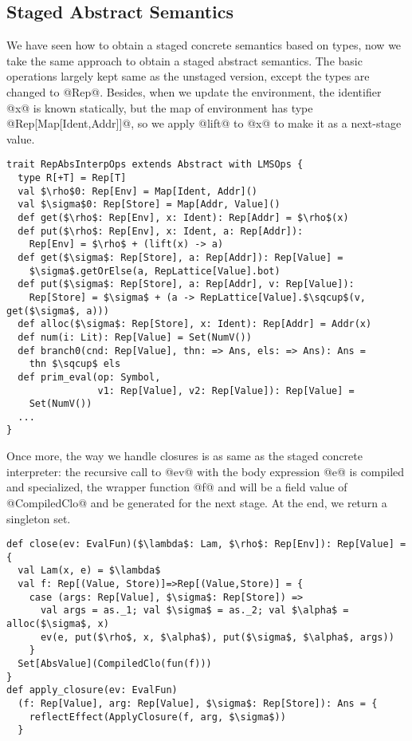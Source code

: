 \subsection{Staged Abstract Semantics} 
We have seen how to obtain a staged concrete semantics
based on types, now we take the same approach to obtain a staged abstract semantics.
The basic operations largely kept same as the unstaged version, except the types are changed to @Rep@.
Besides, when we update the environment, the identifier @x@ is known statically, but the map of environment
has type @Rep[Map[Ident,Addr]]@, so we apply @lift@ to @x@ to make it as a next-stage value.

\begin{lstlisting}
trait RepAbsInterpOps extends Abstract with LMSOps {
  type R[+T] = Rep[T]
  val $\rho$0: Rep[Env] = Map[Ident, Addr]()
  val $\sigma$0: Rep[Store] = Map[Addr, Value]()
  def get($\rho$: Rep[Env], x: Ident): Rep[Addr] = $\rho$(x)
  def put($\rho$: Rep[Env], x: Ident, a: Rep[Addr]): 
    Rep[Env] = $\rho$ + (lift(x) -> a)
  def get($\sigma$: Rep[Store], a: Rep[Addr]): Rep[Value] = 
    $\sigma$.getOrElse(a, RepLattice[Value].bot)
  def put($\sigma$: Rep[Store], a: Rep[Addr], v: Rep[Value]): 
    Rep[Store] = $\sigma$ + (a -> RepLattice[Value].$\sqcup$(v, get($\sigma$, a)))
  def alloc($\sigma$: Rep[Store], x: Ident): Rep[Addr] = Addr(x)
  def num(i: Lit): Rep[Value] = Set(NumV())
  def branch0(cnd: Rep[Value], thn: => Ans, els: => Ans): Ans =
    thn $\sqcup$ els
  def prim_eval(op: Symbol, 
                v1: Rep[Value], v2: Rep[Value]): Rep[Value] = 
    Set(NumV())
  ...
}
\end{lstlisting}

Once more, the way we handle closures is as same as the staged concrete interpreter:
the recursive call to @ev@ with the body expression @e@ is compiled and specialized, 
the wrapper function @f@ and will be a field value of @CompiledClo@ and be generated
for the next stage. At the end, we return a singleton set.

\begin{lstlisting}
def close(ev: EvalFun)($\lambda$: Lam, $\rho$: Rep[Env]): Rep[Value] = {
  val Lam(x, e) = $\lambda$
  val f: Rep[(Value, Store)]=>Rep[(Value,Store)] = {
    case (args: Rep[Value], $\sigma$: Rep[Store]) =>
      val args = as._1; val $\sigma$ = as._2; val $\alpha$ = alloc($\sigma$, x)
      ev(e, put($\rho$, x, $\alpha$), put($\sigma$, $\alpha$, args))
    }
  Set[AbsValue](CompiledClo(fun(f)))
}
def apply_closure(ev: EvalFun)
  (f: Rep[Value], arg: Rep[Value], $\sigma$: Rep[Store]): Ans = {
    reflectEffect(ApplyClosure(f, arg, $\sigma$))
  }
\end{lstlisting}

